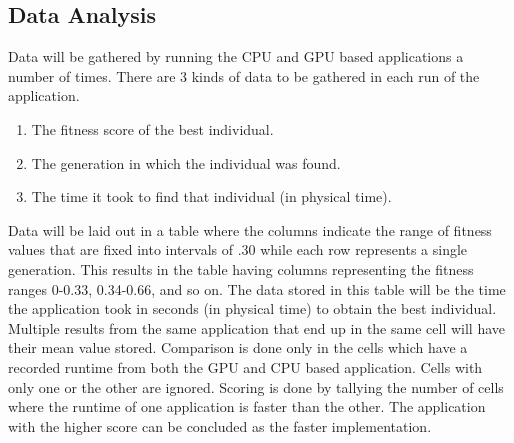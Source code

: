 \subsection{Data Analysis}
Data will be gathered by running the CPU and GPU based applications a number of
times. There are 3 kinds of data to be gathered in each run of the application.

\begin{enumerate}
  \item The fitness score of the best individual.
  \item The generation in which the individual was found.
  \item The time it took to find that individual (in physical time).
\end{enumerate}

Data will be laid out in a table where the columns indicate the range of fitness
values that are fixed into intervals of .30 while each row represents a single
generation. This results in the table having columns representing the fitness
ranges 0-0.33, 0.34-0.66, and so on. The data stored in this table
will be the time the application took in seconds (in physical time) to obtain
the best individual. Multiple results from the same application that end up in
the same cell will have their mean value stored. Comparison is done only in the
cells which have a recorded runtime from both the GPU and CPU based application.
Cells with only one or the other are ignored. Scoring is done by tallying the
number of cells where the runtime of one application is faster than the other.
The application with the higher score can be concluded as the faster 
implementation.